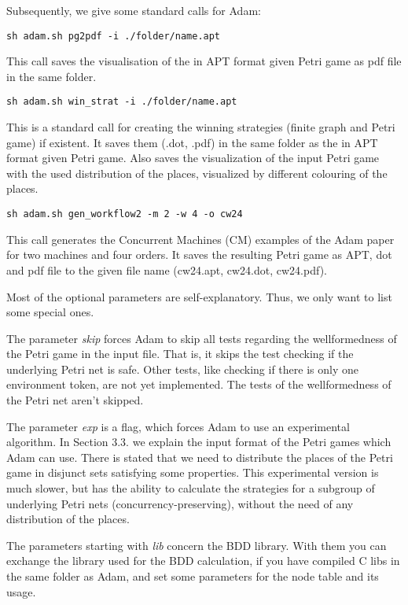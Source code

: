 \documentclass[runningheads]{./llncs/llncs}
\newcommand{\tool}{{\sc Adam}}
\begin{document}
Subsequently, we give some standard calls for \tool{}:
 
\begin{lstlisting}
sh adam.sh pg2pdf -i ./folder/name.apt
\end{lstlisting}
This call saves the visualisation of the in APT format given Petri game as pdf file in the same folder.

\begin{lstlisting}
sh adam.sh win_strat -i ./folder/name.apt
\end{lstlisting}
This is a standard call for creating the winning strategies (finite graph and Petri game) if existent. It saves them (.dot, .pdf) in the same folder as the in APT format given Petri game. Also saves the visualization of the input Petri game with the used distribution of the places, visualized by different colouring of the places.

\begin{lstlisting}
sh adam.sh gen_workflow2 -m 2 -w 4 -o cw24
\end{lstlisting}
This call generates the Concurrent Machines (CM) examples of the \tool{} paper for two machines and four orders. It saves the resulting Petri game as APT, dot and pdf file to the given file name (cw24.apt, cw24.dot, cw24.pdf). 

Most of the optional parameters are self-explanatory. Thus, we only want to list some
special ones.

The parameter \emph{skip} forces \tool{} to skip all tests regarding the wellformedness of the 
Petri game in the input file. That is, it skips the test checking if the underlying 
Petri net is safe. Other tests, like checking if there is only one environment token, are 
not yet implemented. The tests of the wellformedness of the Petri net aren't skipped.

The parameter \emph{exp} is a flag, which forces \tool{} to use an experimental algorithm. In
Section 3.3. we explain the input format of the Petri games which \tool{} can use. There is 
stated that we need to distribute the places of the Petri game in disjunct sets 
satisfying some properties. This experimental version is much slower, but has the ability
to calculate the strategies for a subgroup of underlying Petri nets
(concurrency-preserving), without the need of any distribution of the places. 

The parameters starting with \emph{lib} concern the BDD library. With them you can exchange the
library used for the BDD calculation, if you have compiled C libs in the same folder as
\tool{}, and set some parameters for the node table and its usage.
\end{document}

